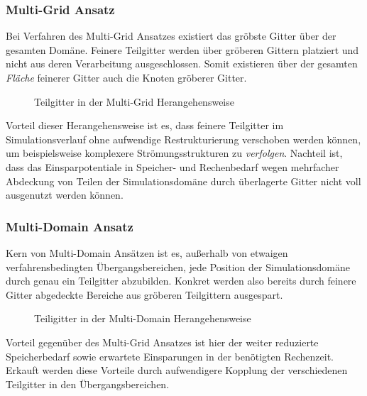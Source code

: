 \subsubsection{Multi-Grid Ansatz}

Bei Verfahren des Multi-Grid Ansatzes
\cite{Lin00}
\cite{Toelke02}
existiert das gröbste Gitter über der gesamten Domäne. Feinere Teilgitter werden über gröberen Gittern platziert und nicht aus deren Verarbeitung ausgeschlossen. Somit existieren über der gesamten \emph{Fläche} feinerer Gitter auch die Knoten gröberer Gitter.

\begin{figure}[h]
\centering

\caption{Teilgitter in der Multi-Grid Herangehensweise}
\end{figure}

Vorteil dieser Herangehensweise ist es, dass feinere Teilgitter im Simulationsverlauf ohne aufwendige Restrukturierung verschoben werden können, um beispielsweise komplexere Strömungsstrukturen zu \emph{verfolgen}. Nachteil ist, dass das Einsparpotentiale in Speicher- und Rechenbedarf wegen mehrfacher Abdeckung von Teilen der Simulationsdomäne durch überlagerte Gitter nicht voll ausgenutzt werden können.

\subsubsection{Multi-Domain Ansatz}

Kern von Multi-Domain Ansätzen
\cite{Chen06}
\cite{DupuisChopard03}
\cite{EitelAmor13}
\cite{Fakhari16}
\cite{Filippova98}
\cite{Lagrava12}
\cite{Peng06}
\cite{Rohde06}
ist es, außerhalb von etwaigen verfahrensbedingten Übergangsbereichen, jede Position der Simulationsdomäne durch genau ein Teilgitter abzubilden. Konkret werden also bereits durch feinere Gitter abgedeckte Bereiche aus gröberen Teilgittern ausgespart.

\begin{figure}[h]
\centering

\caption{Teiligitter in der Multi-Domain Herangehensweise}
\end{figure}

\noindent
Vorteil gegenüber des Multi-Grid Ansatzes ist hier der weiter reduzierte Speicherbedarf sowie erwartete Einsparungen in der benötigten Rechenzeit. Erkauft werden diese Vorteile durch aufwendigere Kopplung \cite[Kap.~3.1]{Lagrava12} der verschiedenen Teilgitter in den Übergangsbereichen.

